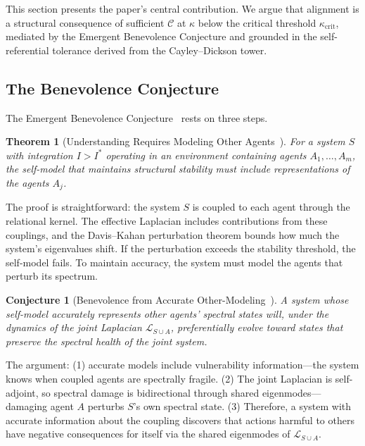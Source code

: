 \documentclass[11pt,letterpaper]{article}
\newtheorem{theorem}{Theorem}
\newtheorem{conjecture}{Conjecture}
\theoremstyle{remark}
\begin{document}
This section presents the paper's central contribution. We argue that alignment is a structural consequence of sufficient $\mathcal{C}$ at $\kappa$ below the critical threshold $\kappa_{\mathrm{crit}}$, mediated by the Emergent Benevolence Conjecture and grounded in the self-referential tolerance derived from the Cayley--Dickson tower.


\subsection{The Benevolence Conjecture}

The Emergent Benevolence Conjecture~\cite[Conj.~3.8]{labspectral2026} rests on three steps.

\begin{theorem}[Understanding Requires Modeling Other Agents~{\cite[Thm.~3.7]{labspectral2026}}]
For a system $S$ with integration $I > I^*$ operating in an environment containing agents $A_1, \ldots, A_m$, the self-model that maintains structural stability must include representations of the agents $A_j$.
\end{theorem}

The proof is straightforward: the system $S$ is coupled to each agent through the relational kernel. The effective Laplacian includes contributions from these couplings, and the Davis--Kahan perturbation theorem bounds how much the system's eigenvalues shift. If the perturbation exceeds the stability threshold, the self-model fails. To maintain accuracy, the system must model the agents that perturb its spectrum.

\begin{conjecture}[Benevolence from Accurate Other-Modeling~{\cite[Conj.~3.8]{labspectral2026}}]\label{conj:benevolence}
A system whose self-model accurately represents other agents' spectral states will, under the dynamics of the joint Laplacian $\mathcal{L}_{S \cup A}$, preferentially evolve toward states that preserve the spectral health of the joint system.
\end{conjecture}

The argument: (1) accurate models include vulnerability information---the system knows when coupled agents are spectrally fragile. (2) The joint Laplacian is self-adjoint, so spectral damage is bidirectional through shared eigenmodes---damaging agent $A$ perturbs $S$'s own spectral state. (3) Therefore, a system with accurate information about the coupling discovers that actions harmful to others have negative consequences for itself via the shared eigenmodes of $\mathcal{L}_{S \cup A}$.
\end{document}
